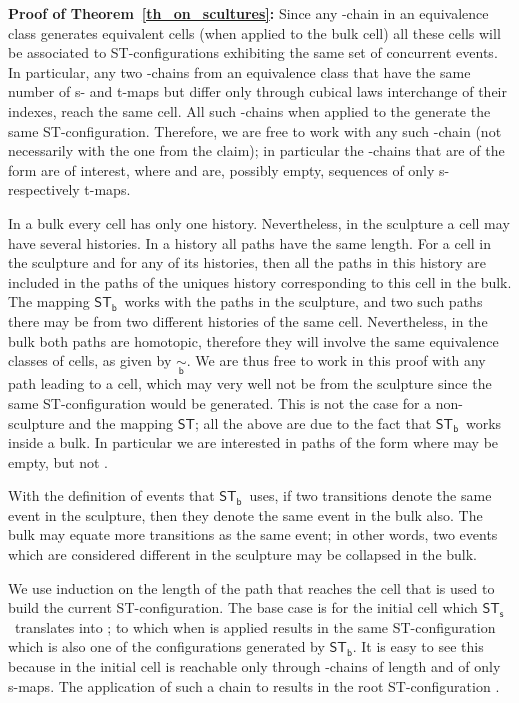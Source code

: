 \documentclass[submission,copyright,creativecommons]{eptcs}
\newenvironment{proof}[1][\!\!\,]{\vspace{1ex}\noindent\textbf{Proof #1: }}{\hfill\vspace{2ex}}
\newcounter{case}
\newcommand\hintost{\ensuremath{\mathsf{ST}}}
\newcommand\sculpintost{\ensuremath{\mathsf{ST}_{\!\mathsf{s}}}}
\newcommand\hintostScultures{\ensuremath{\mathsf{ST}_{\!\mathsf{b}}}}
\newcommand\cellEquivBulk{\ensuremath{\underset{\mathsf{b}}{\sim}}}
\begin{document}
\begin{proof}[of Theorem~\ref{th_on_scultures}]
Since any -chain in an equivalence class generates equivalent cells (when applied to the bulk cell) all these cells will be associated to ST-configurations exhibiting the same set of concurrent events. In particular, any two -chains from an equivalence class that have the same number of s- and t-maps but differ only through cubical laws interchange of their indexes, reach the same cell. All such -chains when applied to the  generate the same ST-configuration. Therefore, we are free to work with any such -chain (not necessarily with the one from the claim); in particular the -chains that are of the form  are of interest, where  and  are, possibly empty, sequences of only s- respectively t-maps.


In a bulk every cell has only one history. 
Nevertheless, in the sculpture a cell may have several histories.
In a history all paths have the same length.
For a cell in the sculpture and for any of its histories, then all the paths in this history are included in the paths of the uniques history corresponding to this cell in the bulk.
The mapping \hintostScultures\ works with the paths in the sculpture, and two such paths there may be from two different histories of the same cell. Nevertheless, in the bulk both paths are homotopic, therefore they will involve the same equivalence classes of  cells, as given by \cellEquivBulk. We are thus free to work in this proof with any path leading to a cell, which may very well not be from the sculpture since the same ST-configuration would be generated. This is not the case for a non-sculpture and the mapping \hintost; all the above are due to the fact that \hintostScultures\ works inside a bulk.
In particular we are interested in paths of the form  where  may be empty, but not .

With the definition of events that \hintostScultures\ uses, if two transitions denote the same event in the sculpture, then they denote the same event in the bulk also. 
The bulk may equate more transitions as the same event; in other words, two events which are considered different in the sculpture may be collapsed in the bulk.

We use induction on the length of the path that reaches the cell that is used to build the current ST-configuration.
The base case is for the initial cell which \sculpintost\ translates into ; to which when  is applied results in the same ST-configuration which is also one of the configurations generated by \hintostScultures. It is easy to see this because in  the initial cell is reachable only through -chains of length  and of only s-maps. The application of such a chain to  results in the root ST-configuration .


\end{proof}
\end{document}
